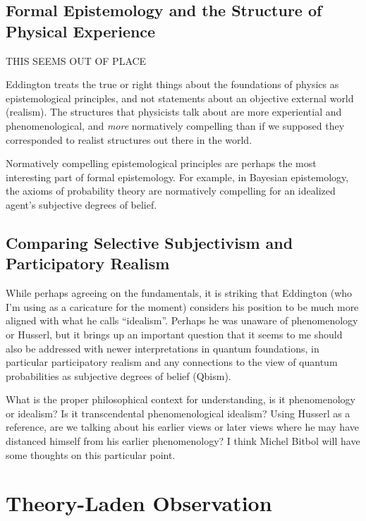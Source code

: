 \subsection{Formal Epistemology and the Structure of Physical Experience}

THIS SEEMS OUT OF PLACE

Eddington treats the true or right things about the foundations of physics as epistemological principles, and not statements about an objective external world (realism).  The structures that physicists talk about are more experiential and phenomenological, and \emph{more} normatively compelling than if we supposed they corresponded to realist structures out there in the world.  

Normatively compelling epistemological principles are perhaps the most interesting part of formal epistemology.  For example, in Bayesian epistemology, the axioms of probability theory are normatively compelling for an idealized agent's subjective degrees of belief.  







\subsection{Comparing Selective Subjectivism and Participatory Realism}

While perhaps agreeing on the fundamentals, it is striking that Eddington (who I'm using as a caricature for the moment) considers his position to be much more aligned with what he calls ``idealism''.  Perhaps he was unaware of phenomenology or Husserl, but it brings up an important question that it seems to me should also be addressed with newer interpretations in quantum foundations, in particular participatory realism and any connections to the view of quantum probabilities as subjective degrees of belief (Qbism).

What is the proper philosophical context for understanding, is it phenomenology or idealism?  Is it transcendental phenomenological idealism?  Using Husserl as a reference, are we talking about his earlier views or later views where he may have distanced himself from his earlier phenomenology?  I think Michel Bitbol will have some thoughts on this particular point.



\section{Theory-Laden Observation}

